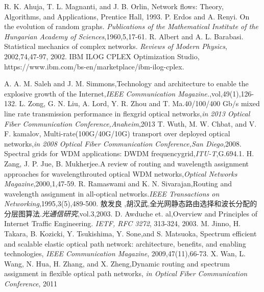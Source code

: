 \documentclass[master]{thesis-uestc}
\begin{document}
\begin{thebibliography}{1}
R. K. Ahuja, T. L. Magnanti, and J. B. Orlin, Network flows: Theory, Algorithms, and Applications, Prentice Hall, 1993.
P. Erdos and A. Renyi. On the evolution of random graphs. \emph{Publications of the Mathematical Institute of the Hungarian Academy of
Sciences},1960,5,17-61.
R. Albert and A. L. Barabasi. Statistical mechanics of complex networks. \emph{Reviews of Modern Physics}, 2002,74,47-97, 2002.
IBM ILOG CPLEX Optimization Studio, https://www.ibm.com/bs-en/marketplace/ibm-ilog-cplex.

A. A. M. Saleh and J. M. Simmons,Technology and architecture to enable the explosive growth of the Internet,\emph{IEEE Communication Magazine.},vol,49(1),126-132.
L. Zong, G. N. Liu, A. Lord, Y. R. Zhou and T. Ma.40/100/400 Gb/s mixed line rate transmission performance in flexgrid optical networks,\emph{in 2013 Optical Fiber Communication Conference,Anaheim},2013
T. Wuth, M. W. Chbat, and V. F. kamalov, Multi-rate(100G/40G/10G) transport over deployed optical networks,\emph{in 2008 Optical Fiber Communication Conference,San Diego},2008.
Spectral grids for WDM applications: DWDM frequencygrid,\emph{ITU-T},G.694.1.
H. Zang, J. P. Jue, B. Mukherjee.A review of routing and wavelength assignment approaches for wavelengthrouted optical WDM networks,\emph{Optical Networks Magazine},2000,1,47-59.
R. Ramaswami and K. N. Sivarajan,Routing and wavelength assignment in all-optical networks.\emph{IEEE Transactions on Networking},1995,3(5),489-500.
敖发良 ,胡汉武,全光网静态路由选择和波长分配的分层图算法.\emph{光通信研究},vol.3,2003.
D. Awduche et. al,Overview and Principles of Internet Traffic Engineering. \emph{IETF, RFC 3272}, 313-324, 2003.
M. Jinno, H. Takara, B. Kozicki, Y. Tsukishima, Y. Sone,and S. Matsuoka, Spectrum efficient and scalable elastic optical path network: architecture, benefits, and enabling technologies, \emph{IEEE Communication Magazine}, 2009,47(11),66-73.
X. Wan, L. Wang, N. Hua, H. Zhang, and X. Zheng,Dynamic routing and spectrum assignment in flexible optical path networks, \emph{in Optical Fiber Communication Conference}, 2011
\end{thebibliography}
\end{document}
